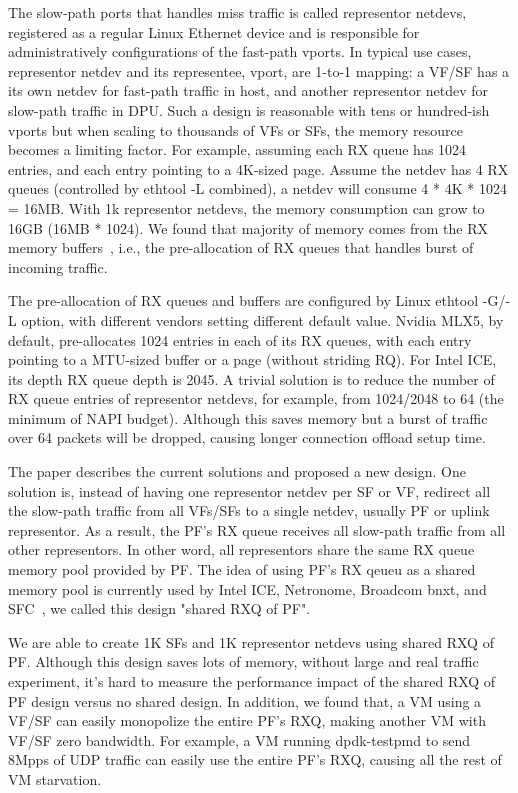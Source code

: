 \documentclass[letterpaper]{article}
\begin{document}
The slow-path ports that handles miss traffic is called representor
netdevs, registered as a regular Linux Ethernet device and is responsible
for administratively configurations of the fast-path vports.
In typical use cases, representor netdev and its representee, vport,
are 1-to-1 mapping: a VF/SF has a its own netdev for fast-path traffic
in host, and another representor netdev for slow-path traffic in DPU.
Such a design is reasonable with tens or hundred-ish vports but when scaling
to thousands of VFs or SFs, the memory resource becomes a limiting factor.
For example, assuming each RX queue has 1024 entries, and each entry
pointing to a 4K-sized page. Assume the netdev has 4 RX queues (controlled
by ethtool -L combined), a netdev will consume 4 * 4K * 1024 = 16MB.
With 1k representor netdevs, the memory consumption can grow
to 16GB (16MB * 1024). We found that majority of memory comes from
the RX memory buffers~\cite{jakub}, i.e., the pre-allocation of
RX queues that handles burst of incoming traffic.

The pre-allocation of RX queues and buffers are configured by Linux
ethtool -G/-L option, with different vendors setting different default
value. Nvidia MLX5, by default, pre-allocates 1024 entries in each of
its RX queues, with each entry pointing to a MTU-sized buffer or a page
(without striding RQ). For Intel ICE, its depth RX queue depth is 2045.
A trivial solution is to reduce the number of RX queue entries of
representor netdevs, for example, from 1024/2048 to 64 (the minimum of NAPI
budget). Although this saves memory but a burst of traffic over 64 packets
will be dropped, causing longer connection offload setup time.

The paper describes the current solutions and proposed a new design.
One solution is, instead of having one representor netdev per SF or VF,
redirect all the slow-path traffic from all VFs/SFs to a single netdev,
usually PF or uplink representor. As a result, the PF's RX queue receives
all slow-path traffic from all other representors. In other word, all representors
share the same RX queue memory pool provided by PF. The idea of using PF's
RX qeueu as a shared memory pool is currently used by Intel ICE, Netronome,
Broadcom bnxt, and SFC~\cite{survey}, we called this design "shared RXQ of PF".

We are able to create 1K SFs and 1K representor netdevs using shared RXQ
of PF. Although this design saves lots of memory, without large and real traffic experiment, it's hard to measure the performance impact of the shared RXQ
of PF design versus no shared design.
In addition, we found that, a VM using a VF/SF can easily monopolize the
entire PF's RXQ, making another VM with VF/SF zero bandwidth.
For example, a VM
running dpdk-testpmd to send 8Mpps of UDP traffic can easily use the
entire PF's RXQ, causing all the rest of VM starvation.
\end{document}
